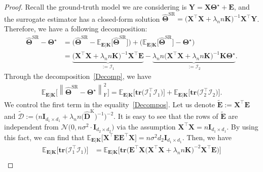 \documentclass[12pt]{article}
\begin{document}
\begin{proof}
Recall the ground-truth model we are considering is $\mathbf{Y}=\mathbf{X}\boldsymbol{\Theta^{\star}}+\mathbf{E}$, and the surrogate estimator has a closed-form solution 
$\widehat{\mathbf{\Theta}}^{\text{SR}}=\big(\mathbf{X}^{\top}\mathbf{X}+\lambda_{n}n\mathbf{K}\big)^{-1}\mathbf{X}^{\top}\mathbf{Y}$.
Therefore, we have a following decomposition:
\begin{align} \label{Decomp}
    \widehat{\mathbf{\Theta}}^{\text{SR}} - \boldsymbol{\Theta^\star} 
    &= \big(\widehat{\mathbf{\Theta}}^{\text{SR}} - \mathbb{E}_{\mathbf{E}|\mathbf{K}}\big[ \widehat{\mathbf{\Theta}}^{\text{SR}} \big]\big) 
    + \big( \mathbb{E}_{\mathbf{E}|\mathbf{K}} \big[ \widehat{\mathbf{\Theta}}^{\text{SR}} \big] - \boldsymbol{\Theta^\star} \big) \nonumber \\
    &= \underbrace{\big(\mathbf{X}^{\top}\mathbf{X}+\lambda_{n}n\mathbf{K}\big)^{-1}\mathbf{X}^{\top}\mathbf{E}}_{:=\mathcal{I}_{1}}
    - \underbrace{\lambda_{n}n \big(\mathbf{X}^{\top}\mathbf{X}+\lambda_{n}n\mathbf{K}\big)^{-1}\mathbf{K}\boldsymbol{\Theta^\star}}_{:=\mathcal{I}_{2}}.
\end{align}
Through the decomposition~\eqref{Decomp}, we have
\begin{align} \label{Decompos}
    \mathbb{E}_{\mathbf{E}|\mathbf{K}}\bigg[ \left\| \widehat{\mathbf{\Theta}}^{\text{SR}} - \boldsymbol{\Theta^\star} \right\|_{\text{F}}^{2} \bigg]
    = \mathbb{E}_{\mathbf{E}|\mathbf{K}}\bigg[\textbf{tr}\big(\mathcal{I}_{1}^{\top}\mathcal{I}_{1}\big)\bigg]
    + \mathbb{E}_{\mathbf{E}|\mathbf{K}}\bigg[\textbf{tr}\big(\mathcal{I}_{2}^{\top}\mathcal{I}_{2}\big)\bigg].
\end{align}
We control the first term in the equality~\eqref{Decompos}.
Let us denote $ \widetilde{\mathbf{E}} := \mathbf{X}^{\top} \mathbf{E}$ and 
$\widetilde{\mathcal{D}} := \big(n\mathbf{I}_{d_{1} \times d_{1}}+\lambda_{n}n \big(\widehat{\mathbf{D}}^{\text{K}}\big)^{-1}\big)^{-2}$. 
It is easy to see that the rows of $\widetilde{\mathbf{E}}$ are independent from $\mathcal{N}\big(0, n \sigma^{2} \cdot \mathbf{I}_{d_{2} \times d_{2}} \big)$ via  
the assumption $\mathbf{X}^{\top}\mathbf{X}=n\mathbf{I}_{d_{1} \times d_{1}}$.
By using this fact, we can find that $\mathbb{E}_{\mathbf{E}|\mathbf{K}}\big[\mathbf{X}^{\top}\mathbf{E} \mathbf{E}^{\top}\mathbf{X}\big]=n\sigma^2 d_{2} \mathbf{I}_{d_{1} \times d_{1}}$.
Then, we have
\begin{align}
    \mathbb{E}_{\mathbf{E}|\mathbf{K}}\bigg[\textbf{tr}\big(\mathcal{I}_{1}^{\top}\mathcal{I}_{1}\big)\bigg]
    &= \mathbb{E}_{\mathbf{E}|\mathbf{K}}\bigg[\textbf{tr}\big( \mathbf{E}^{\top}\mathbf{X} \big(\mathbf{X}^{\top}\mathbf{X}+\lambda_{n}n\mathbf{K}\big)^{-2}\mathbf{X}^{\top}\mathbf{E} \big)\bigg] \nonumber  \\

\end{align}
\end{proof}
\end{document}
